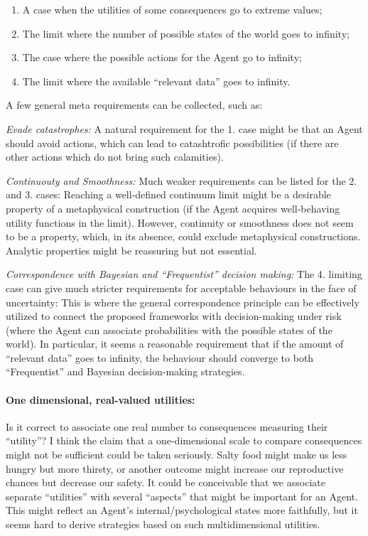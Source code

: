 \documentclass{article}
\begin{document}
\begin{enumerate}
    \item A case when the utilities of some consequences go to extreme values;
    \item The limit where the number of possible states of the world goes to infinity;
    \item The case where the possible actions for the Agent go to infinity;
    \item The limit where the available ``relevant data'' goes to infinity.
\end{enumerate}

A few general meta requirements can be collected, such as:

{\it Evade catastrophes:}
A natural requirement for the 1. case might be that an Agent should avoid actions, which can lead to catashtrofic possibilities (if there are other actions which do not bring such calamities).

{\it Continuouty and Smoothness:}
Much weaker requirements can be listed for the 2. and 3. cases:
Reaching a well-defined continuum limit might be a desirable property of a metaphysical construction (if the Agent acquires well-behaving utility functions in the limit).
However, continuity or smoothness does not seem to be a property, which, in its absence, could exclude metaphysical constructions.
Analytic properties might be reassuring but not essential.

{\it Correspondence with Bayesian and ``Frequentist'' decision making:}
The 4. limiting case can give much stricter requirements for acceptable behaviours in the face of uncertainty:
This is where the general correspondence principle can be effectively utilized to connect the proposed frameworks with decision-making under risk (where the Agent can associate probabilities with the possible states of the world).
In particular, it seems a reasonable requirement that if the amount of ``relevant data'' goes to infinity, the behaviour should converge to both ``Frequentist'' and Bayesian decision-making strategies.

\paragraph{One dimensional, real-valued utilities:}
Is it correct to associate one real number to consequences measuring their ``utility''?
I think the claim that a one-dimensional scale to compare consequences might not be sufficient could be taken seriously. Salty food might make us less hungry but more thirsty, or another outcome might increase our reproductive chances but decrease our safety. It could be conceivable that we associate separate ``utilities'' with several ``aspects'' that might be important for an Agent.
This might reflect an Agent’s internal/psychological states more faithfully, but it seems hard to derive strategies based on such multidimensional utilities.
\end{document}
